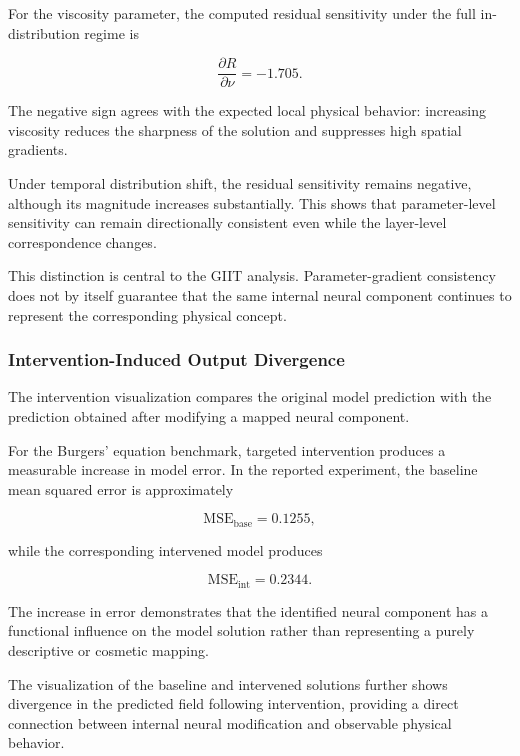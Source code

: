 \documentclass[12pt,singleside,a4paper]{article}
\begin{document}
For the viscosity parameter, the computed residual sensitivity under
the full in-distribution regime is

\begin{equation}
    \frac{\partial R}{\partial \nu} = -1.705.
\end{equation}

The negative sign agrees with the expected local physical behavior:
increasing viscosity reduces the sharpness of the solution and
suppresses high spatial gradients.

Under temporal distribution shift, the residual sensitivity remains
negative, although its magnitude increases substantially. This shows
that parameter-level sensitivity can remain directionally consistent
even while the layer-level correspondence changes.

This distinction is central to the GIIT analysis. Parameter-gradient
consistency does not by itself guarantee that the same internal neural
component continues to represent the corresponding physical concept.


\subsubsection{Intervention-Induced Output Divergence}

The intervention visualization compares the original model prediction
with the prediction obtained after modifying a mapped neural component.

For the Burgers' equation benchmark, targeted intervention produces a
measurable increase in model error. In the reported experiment, the
baseline mean squared error is approximately

\begin{equation}
    \mathrm{MSE}_{\mathrm{base}} = 0.1255,
\end{equation}

while the corresponding intervened model produces

\begin{equation}
    \mathrm{MSE}_{\mathrm{int}} = 0.2344.
\end{equation}

The increase in error demonstrates that the identified neural
component has a functional influence on the model solution rather
than representing a purely descriptive or cosmetic mapping.

The visualization of the baseline and intervened solutions further
shows divergence in the predicted field following intervention,
providing a direct connection between internal neural modification and
observable physical behavior.
\end{document}
